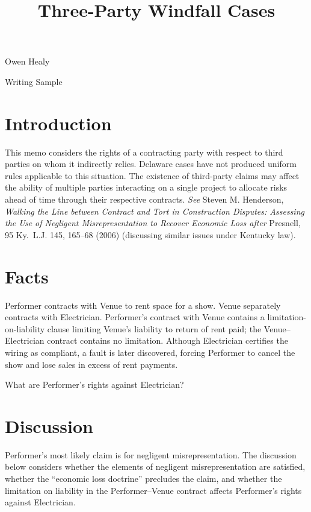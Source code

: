 \documentclass[
  12pt,
  letterpaper,
]{scrartcl}
\title{Three-Party Windfall Cases}
\author{}
\date{}
\begin{document}

\begin{center}
{\noindent Owen Healy}

{\noindent Writing Sample}
\end{center}

\hypertarget{introduction}{%
\section{Introduction}\label{introduction}}

This memo considers the rights of a contracting party with respect to
third parties on whom it indirectly relies. Delaware cases have not
produced uniform rules applicable to this situation. The existence of
third-party claims may affect the ability of multiple parties
interacting on a single project to allocate risks ahead of time through
their respective contracts. \emph{See} Steven M. Henderson,
\emph{Walking the Line between Contract and Tort in Construction
Disputes: Assessing the Use of Negligent Misrepresentation to Recover
Economic Loss after} Presnell, 95 Ky.~L.J. 145, 165--68 (2006)
(discussing similar issues under Kentucky law).

\hypertarget{facts}{%
\section{Facts}\label{facts}}

Performer contracts with Venue to rent space for a show. Venue
separately contracts with Electrician. Performer's contract with Venue
contains a limitation-on-liability clause limiting Venue's liability to
return of rent paid; the Venue--Electrician contract contains no
limitation. Although Electrician certifies the wiring as compliant, a
fault is later discovered, forcing Performer to cancel the show and lose
sales in excess of rent payments.

What are Performer's rights against Electrician?

\hypertarget{discussion}{%
\section{Discussion}\label{discussion}}

Performer's most likely claim is for negligent misrepresentation. The
discussion below considers whether the elements of negligent
misrepresentation are satisfied, whether the ``economic loss doctrine''
precludes the claim, and whether the limitation on liability in the
Performer--Venue contract affects Performer's rights against
Electrician.
\end{document}
